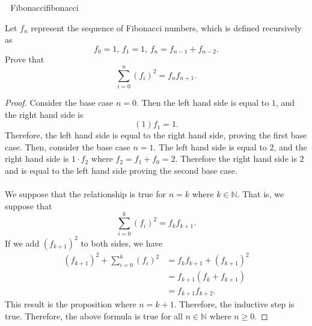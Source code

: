         \begin{exercise}{\Difficulty\,\Difficulty\,\Difficulty\,\,Fibonacci}{fibonacci}
        
            Let \(f_n\) represent the sequence of Fibonacci numbers, which is defined recursively as
            \begin{equation*}
                f_0=1,\,f_1=1,\,f_n=f_{n-1}+f_{n-2}.
            \end{equation*}
            Prove that
            \begin{equation*}
                \sum_{i=0}^n(f_i)^2=f_nf_{n+1}.
            \end{equation*}
            \begin{proof}
                Consider the base case \(n=0\). Then the left hand side is equal to \(1\), and the right hand side is
                \begin{equation*}
                    (1)f_1=1.
                \end{equation*}
                Therefore, the left hand side is equal to the right hand side, proving the first base case. Then, consider the base case \(n=1\). The left hand side is equal to \(2\), and the right hand side is \(1\cdot f_2\) where \(f_2=f_1+f_0=2\). Therefore the right hand side is \(2\) and is equal to the left hand side proving the second base case.
                \\
                \\
                We suppose that the relationship is true for \(n=k\) where \(k\in\mathbb{N}\). That is, we suppose that
                \begin{equation*}
                    \sum_{i=0}^k(f_i)^2=f_kf_{k+1}.
                \end{equation*}
                If we add \((f_{k+1})^2\) to both sides, we have
                \begin{align*}
                    (f_{k+1})^2+\sum_{i=0}^k(f_i)^2&=f_kf_{k+1}+(f_{k+1})^2 \\
                    &=f_{k+1}(f_k+f_{k+1}) \\
                    &=f_{k+1}f_{k+2}.
                \end{align*}
                This result is the proposition where \(n=k+1\). Therefore, the inductive step is true. Therefore, the above formula is true for all \(n\in\mathbb{N}\) where \(n \geq 0\).
            \end{proof}
        \end{exercise}
        
